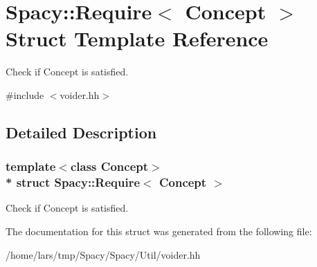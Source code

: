 \hypertarget{structSpacy_1_1Require}{}\section{Spacy\+:\+:Require$<$ Concept $>$ Struct Template Reference}
\label{structSpacy_1_1Require}


Check if Concept is satisfied.  




{\ttfamily \#include $<$voider.\+hh$>$}



\subsection{Detailed Description}
\subsubsection*{template$<$class Concept$>$\\*
struct Spacy\+::\+Require$<$ Concept $>$}

Check if Concept is satisfied. 

The documentation for this struct was generated from the following file\+:\begin{DoxyCompactItemize}
\item 
/home/lars/tmp/\+Spacy/\+Spacy/\+Util/voider.\+hh\end{DoxyCompactItemize}
